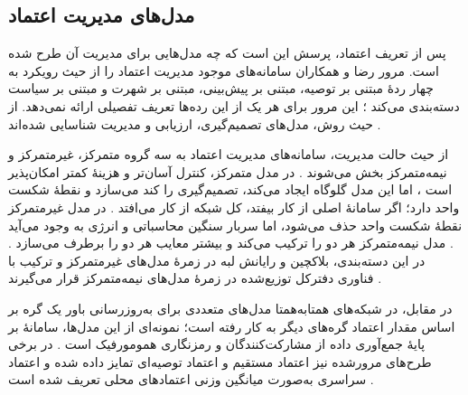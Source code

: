 \subsection{مدل‌های مدیریت اعتماد}

پس از تعریف اعتماد، پرسش این است که چه مدل‌هایی برای مدیریت آن طرح شده است. مرور رضا و همکاران سامانه‌های موجود مدیریت اعتماد را از حیث رویکرد به چهار ردهٔ مبتنی بر توصیه، مبتنی بر پیش‌بینی، مبتنی بر شهرت و مبتنی بر سیاست دسته‌بندی می‌کند \cite{razaBlockchainBasedReputationTrust2024}؛ این مرور برای هر یک از این رده‌ها تعریف تفصیلی ارائه نمی‌دهد. از حیث روش، مدل‌های تصمیم‌گیری، ارزیابی و مدیریت شناسایی شده‌اند \cite{razaBlockchainBasedReputationTrust2024}.

از حیث حالت مدیریت، سامانه‌های مدیریت اعتماد به سه گروه متمرکز، غیرمتمرکز و نیمه‌متمرکز بخش می‌شوند \cite{razaBlockchainBasedReputationTrust2024}. در مدل متمرکز، کنترل آسان‌تر و هزینهٔ کمتر امکان‌پذیر است \cite{ghovanlooyghajarSBTMSScalableBlockchain2021}، اما این مدل گلوگاه ایجاد می‌کند، تصمیم‌گیری را کند می‌سازد و نقطهٔ شکست واحد دارد؛ اگر سامانهٔ اصلی از کار بیفتد، کل شبکه از کار می‌افتد \cite{ghovanlooyghajarSBTMSScalableBlockchain2021}. در مدل غیرمتمرکز نقطهٔ شکست واحد حذف می‌شود، اما سربار سنگین محاسباتی و انرژی به وجود می‌آید \cite{razaBlockchainBasedReputationTrust2024}. مدل نیمه‌متمرکز هر دو را ترکیب می‌کند و بیشتر معایب هر دو را برطرف می‌سازد \cite{razaBlockchainBasedReputationTrust2024}. در این دسته‌بندی، بلاکچین و رایانش لبه در زمرهٔ مدل‌های غیرمتمرکز و ترکیب با فناوری دفترکل توزیع‌شده در زمرهٔ مدل‌های نیمه‌متمرکز قرار می‌گیرند \cite{razaBlockchainBasedReputationTrust2024}.

در مقابل، در شبکه‌های همتابه‌همتا مدل‌های متعددی برای به‌روزرسانی باور یک گره بر اساس مقدار اعتماد گره‌های دیگر به کار رفته است؛ نمونه‌ای از این مدل‌ها، سامانهٔ  بر پایهٔ جمع‌آوری داده از مشارکت‌کنندگان و رمزنگاری همومورفیک است \cite{ghovanlooyghajarSBTMSScalableBlockchain2021}. در برخی طرح‌های مرورشده نیز اعتماد مستقیم و اعتماد توصیه‌ای تمایز داده شده و اعتماد سراسری به‌صورت میانگین وزنی اعتمادهای محلی تعریف شده است \cite{razaBlockchainBasedReputationTrust2024}.

